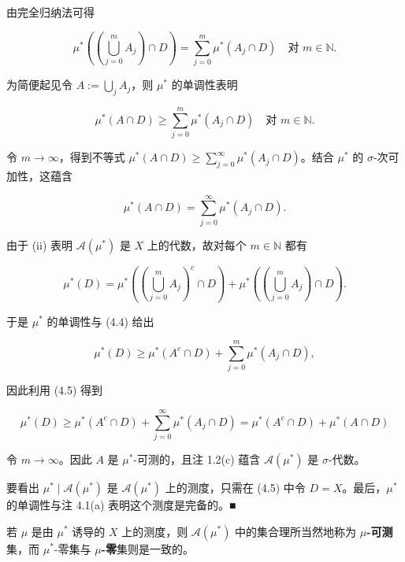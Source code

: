 \begin{theorem}
\begin{subitems}
由完全归纳法可得

\begin{equation}
\mu^*\left(\left(\bigcup_{j=0}^{m} A_j\right) \cap D\right) = \sum_{j=0}^{m} \mu^*(A_j \cap D) \quad\text{对 } m \in \mathbb{N} .\tag{4.4}
\end{equation}

为简便起见令 $ A := \bigcup_j A_j $，则 $ \mu^* $ 的单调性表明

\[
\mu^*(A \cap D) \ge \sum_{j=0}^{m} \mu^*(A_j \cap D) \quad\text{对 } m \in \mathbb{N} .
\]

令 $ m \to \infty $，得到不等式 $ \mu^*(A \cap D) \ge \sum_{j=0}^{\infty} \mu^*(A_j \cap D) $。结合 $ \mu^* $ 的 $ \sigma $-次可加性，这蕴含

\begin{equation}
\mu^*(A \cap D) = \sum_{j=0}^{\infty} \mu^*(A_j \cap D) .\tag{4.5}
\end{equation}

由于 (ii) 表明 $ \mathcal{A}(\mu^*) $ 是 $ X $ 上的代数，故对每个 $ m \in \mathbb{N} $ 都有

\[
\mu^*(D) = \mu^*\left(\left(\bigcup_{j=0}^{m} A_j\right)^{c} \cap D\right) + \mu^*\left(\left(\bigcup_{j=0}^{m} A_j\right) \cap D\right) .
\]

于是 $ \mu^* $ 的单调性与 (4.4) 给出

\[
\mu^*(D) \ge \mu^*(A^c \cap D) + \sum_{j=0}^{m} \mu^*(A_j \cap D) ,
\]

因此利用 (4.5) 得到

\[
\mu^*(D) \ge \mu^*(A^c \cap D) + \sum_{j=0}^{\infty} \mu^*(A_j \cap D) = \mu^*(A^c \cap D) + \mu^*(A \cap D)
\]

令 $ m \to \infty $。因此 $ A $ 是 $ \mu^* $-可测的，且注 1.2(c) 蕴含 $ \mathcal{A}(\mu^*) $ 是 $ \sigma $-代数。

\item

要看出 $ \mu^* \mid \mathcal{A}(\mu^*) $ 是 $ \mathcal{A}(\mu^*) $ 上的测度，只需在 (4.5) 中令 $ D = X $。最后，$ \mu^* $ 的单调性与注 4.1(a) 表明这个测度是完备的。\nobreak\hspace{0.35em}■

\end{subitems}

\end{theorem}

若 $ \mu $ 是由 $ \mu^* $ 诱导的 $ X $ 上的测度，则 $ \mathcal{A}(\mu^*) $ 中的集合理所当然地称为 \textbf{$ \mu $-可测}集，而 $ \mu^* $-零集与 \textbf{$ \mu $-零}集则是一致的。


